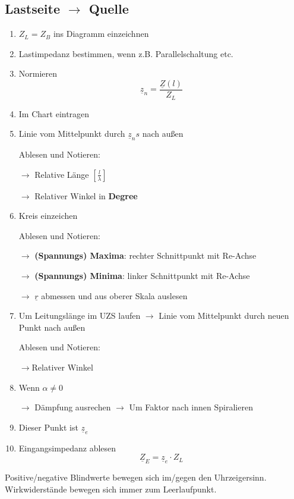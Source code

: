 \subsection[Von Last zu Quelle]{Lastseite $\rightarrow$ Quelle}
\begin{enumerate}
    \item $Z_L = Z_B$ ins Diagramm einzeichnen
    \item Lastimpedanz bestimmen,
          wenn z.B. Parallelschaltung etc.
    \item Normieren
          \[\underline{z}_n = \frac{\underline{Z}(l)}{Z_L} \]
    \item Im Chart eintragen
    \item Linie vom Mittelpunkt durch $\underline{z}_ns$ nach außen

          Ablesen und Notieren:

          $\rightarrow$ Relative Länge $\left[\frac{l}{\lambda}\right]$

          $\rightarrow$ Relativer Winkel in \textbf{Degree}
    \item Kreis einzeichen

          Ablesen und Notieren:
		
          $\rightarrow$ \textbf{(Spannungs) Maxima}: rechter Schnittpunkt mit Re-Achse

          $\rightarrow$ \textbf{(Spannungs) Minima}: linker Schnittpunkt mit Re-Achse

          $\rightarrow$ $ \underline{r} $ abmessen und aus oberer Skala auslesen
    \item Um Leitungslänge im UZS laufen
          $\rightarrow$ Linie vom Mittelpunkt durch neuen Punkt nach außen

          Ablesen und Notieren:

          $\rightarrow$Relativer Winkel
    \item Wenn $\alpha\neq 0$

          $\rightarrow$ Dämpfung ausrechen
          $\rightarrow$ Um Faktor nach innen Spiralieren

    \item Dieser Punkt ist $\underline{z}_e$
    \item Eingangsimpedanz ablesen
          \[\underline{Z}_E = \underline{z}_e \cdot Z_L\]
\end{enumerate}


Positive/negative Blindwerte bewegen sich im/gegen den Uhrzeigersinn. Wirkwiderstände bewegen sich immer zum Leerlaufpunkt.

